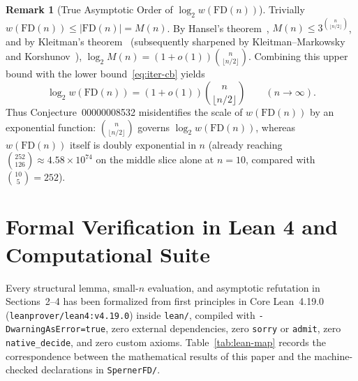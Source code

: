 \documentclass[11pt]{article}
\theoremstyle{definition}
\newtheorem{remark}[theorem]{Remark}
\newcommand{\FD}{\mathrm{FD}}
\begin{document}
\begin{remark}[True Asymptotic Order of $\log_2 w(\FD(n))$]
Trivially $w(\FD(n)) \le |\FD(n)| = M(n)$. By Hansel's theorem~\cite{Hansel1966}, $M(n) \le 3^{\binom{n}{\lfloor n/2 \rfloor}}$, and by Kleitman's theorem~\cite{Kleitman1969} (subsequently sharpened by Kleitman--Markowsky~\cite{KleitmanMarkowsky1975} and Korshunov~\cite{Korshunov1981}), $\log_2 M(n) = (1 + o(1))\binom{n}{\lfloor n/2 \rfloor}$. Combining this upper bound with the lower bound~\eqref{eq:iter-cb} yields
\[
  \log_2 w(\FD(n)) = (1 + o(1)) \binom{n}{\lfloor n/2 \rfloor} \qquad (n \to \infty).
\]
Thus Conjecture~00000008532 misidentifies the scale of $w(\FD(n))$ by an exponential function: $\binom{n}{\lfloor n/2 \rfloor}$ governs $\log_2 w(\FD(n))$, whereas $w(\FD(n))$ itself is doubly exponential in $n$ (already reaching $\binom{252}{126} \approx 4.58 \times 10^{74}$ on the middle slice alone at $n = 10$, compared with $\binom{10}{5} = 252$).
\end{remark}

\section{Formal Verification in Lean 4 and Computational Suite}

Every structural lemma, small-$n$ evaluation, and asymptotic refutation in Sections~2--4 has been formalized from first principles in Core Lean~4.19.0 (\texttt{leanprover/lean4:v4.19.0}) inside \texttt{lean/}, compiled with \texttt{-DwarningAsError=true}, zero external dependencies, zero \texttt{sorry} or \texttt{admit}, zero \texttt{native\_decide}, and zero custom axioms. Table~\ref{tab:lean-map} records the correspondence between the mathematical results of this paper and the machine-checked declarations in \texttt{SpernerFD/}.
\end{document}
